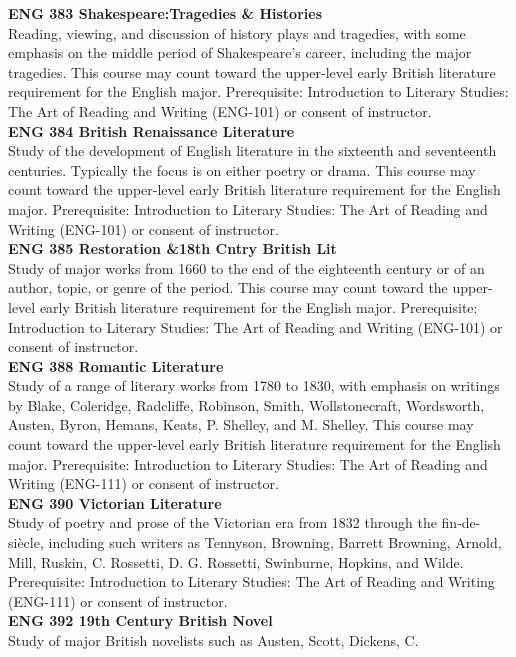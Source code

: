 \documentclass[
  letterpaper,
]{scrbook}
\begin{document}
\textbf{ENG 383 Shakespeare:Tragedies \& Histories}\\
Reading, viewing, and discussion of history plays and tragedies, with
some emphasis on the middle period of Shakespeare's career, including
the major tragedies. This course may count toward the upper-level early
British literature requirement for the English major. Prerequisite:
Introduction to Literary Studies: The Art of Reading and Writing
(ENG-101) or consent of instructor.\\
\textbf{ENG 384 British Renaissance Literature}\\
Study of the development of English literature in the sixteenth and
seventeenth centuries. Typically the focus is on either poetry or drama.
This course may count toward the upper-level early British literature
requirement for the English major. Prerequisite: Introduction to
Literary Studies: The Art of Reading and Writing (ENG-101) or consent of
instructor.\\
\textbf{ENG 385 Restoration \&18th Cntry British Lit}\\
Study of major works from 1660 to the end of the eighteenth century or
of an author, topic, or genre of the period. This course may count
toward the upper-level early British literature requirement for the
English major. Prerequisite: Introduction to Literary Studies: The Art
of Reading and Writing (ENG-101) or consent of instructor.\\
\textbf{ENG 388 Romantic Literature}\\
Study of a range of literary works from 1780 to 1830, with emphasis on
writings by Blake, Coleridge, Radcliffe, Robinson, Smith,
Wollstonecraft, Wordsworth, Austen, Byron, Hemans, Keats, P. Shelley,
and M. Shelley. This course may count toward the upper-level early
British literature requirement for the English major. Prerequisite:
Introduction to Literary Studies: The Art of Reading and Writing
(ENG-111) or consent of instructor.\\
\textbf{ENG 390 Victorian Literature}\\
Study of poetry and prose of the Victorian era from 1832 through the
fin-de-siècle, including such writers as Tennyson, Browning, Barrett
Browning, Arnold, Mill, Ruskin, C. Rossetti, D. G. Rossetti, Swinburne,
Hopkins, and Wilde. Prerequisite: Introduction to Literary Studies: The
Art of Reading and Writing (ENG-111) or consent of instructor.\\
\textbf{ENG 392 19th Century British Novel}\\
Study of major British novelists such as Austen, Scott, Dickens, C.
\end{document}
